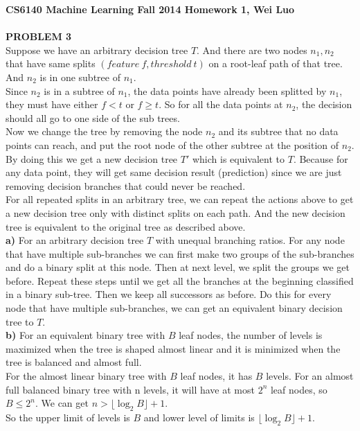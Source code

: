 \documentclass[11pt,a4paper,fleqn]{article}
\begin{document}
\textbf{CS6140 Machine Learning Fall 2014 Homework 1, Wei Luo }\\
\\
\textbf{PROBLEM 3}\\
Suppose we have an arbitrary decision tree $T$. And there are two nodes $n_1, n_2$ that have same splits $(feature\ f, threshold\ t)$ on a root-leaf path of that tree. And $n_2$ is in one subtree of $n_1$.\\
Since $n_2$ is in a subtree of $n_1$, the data points have already been splitted by $n_1$, they must have either $f < t$ or $f \ge t$. So for all the data points at $n_2$, the decision should all go to one side of the sub trees.\\
Now we change the tree by removing the node $n_2$ and its subtree that no data points can reach, and put the root node of the other subtree at the position of $n_2$. By doing this we get a new decision tree $T'$ which is equivalent to $T$. Because for any data point, they will get same decision result (prediction) since we are just removing decision branches that could never be reached.\\
For all repeated splits in an arbitrary tree, we can repeat the actions above to get a new decision tree only with distinct splits on each path. And the new decision tree is equivalent to the original tree as described above.\\
\textbf{a)} For an arbitrary decision tree $T$ with unequal branching ratios. For any node that have multiple sub-branches we can first make two groups of the sub-branches and do a binary split at this node. Then at next level, we split the groups we get before. Repeat these steps until we get all the branches at the beginning classified in a binary sub-tree. Then we keep all successors as before. Do this for every node that have multiple sub-branches, we can get an equivalent binary decision tree to $T$.\\
\textbf{b)} For an equivalent binary tree with $B$ leaf nodes, the number of levels is maximized when the tree is shaped almost linear and it is minimized when the tree is balanced and almost full.\\
For the almost linear binary tree with $B$ leaf nodes, it has $B$ levels. For an almost full balanced binary tree with n levels, it will have at most $2^n$ leaf nodes, so $B \le 2^n$. We can get $n > \lfloor \log_2{B} \rfloor + 1$.\\
So the upper limit of levels is $B$ and lower level of limits is  $\lfloor \log_2{B} \rfloor + 1$.\\
\end{document}
